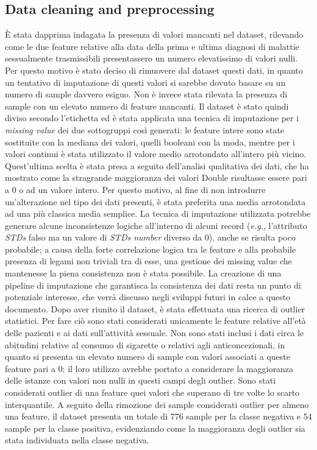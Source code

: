 \subsection{Data cleaning and preprocessing}
È stata dapprima indagata la presenza di valori mancanti nel dataset, rilevando come le due feature relative alla data della prima e ultima diagnosi di malattie sessualmente trasmissibili presentassero un numero elevatissimo di valori nulli.
Per questo motivo è stato deciso di rimuovere dal dataset questi dati, in quanto un tentativo di imputazione di questi valori si sarebbe dovuto basare su un numero di sample davvero esiguo. Non è invece stata rilevata la presenza di sample con un elevato numero di feature mancanti.
Il dataset è stato quindi diviso secondo l'etichetta ed è stata applicata una tecnica di imputazione per i \textit{missing value} dei due sottogruppi così generati: le feature intere sono state sostituite con la mediana dei valori, quelli booleani con la moda, mentre per i valori continui è stata utilizzato il valore medio arrotondato all'intero più vicino. Quest'ultima scelta è stata presa a seguito dell'analisi qualitativa dei dati, che ha mostrato come la stragrande maggioranza dei valori Double risultasse essere pari a 0 o ad un valore intero. Per questo motivo, al fine di non introdurre un'alterazione nel tipo dei dati presenti, è stata preferita una media arrotondata ad una più classica media semplice.
La tecnica di imputazione utilizzata potrebbe generare alcune inconsistenze logiche all'interno di alcuni record (\textit{e.g.}, l'attributo \textit{STDs} falso ma un valore di \textit{STDs number} diverso da 0), anche se risulta poco probabile; a causa della forte correlazione logica tra le feature e alla probabile presenza di legami non triviali tra di esse, una gestione dei missing value che mantenesse la piena consistenza non è stata possibile. 
La creazione di una pipeline di imputazione che garantisca la consistenza dei dati resta un punto di potenziale interesse, che verrà discusso negli sviluppi futuri in calce a questo documento.
Dopo aver riunito il dataset, è stata effettuata una ricerca di outlier statistici.
Per fare ciò sono stati considerati unicamente le feature relative all'età delle pazienti e ai dati sull'attività sessuale. Non sono stati inclusi i dati circa le abitudini relative al consumo di sigarette o relativi agli anticoncezionali, in quanto si presenta un elevato numero di sample con valori associati a queste feature pari a $0$; il loro utilizzo avrebbe portato a considerare la maggioranza delle istanze con valori non nulli in questi campi degli outlier. Sono stati considerati outlier di una feature quei valori che superano di tre volte lo scarto interquantile. 
A seguito della rimozione dei sample considerati outlier per almeno una feature, il dataset presenta un totale di 776 sample per la classe negativa e 54 sample per la classe positiva, evidenziando come la maggioranza degli outlier sia stata individuata nella classe negativa.
